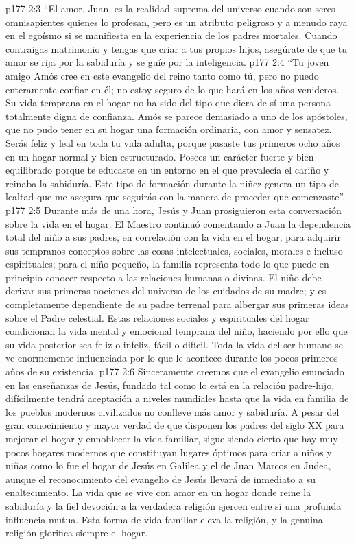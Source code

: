\vs p177 2:3 “El amor, Juan, es la realidad suprema del universo cuando son seres omnisapientes quienes lo profesan, pero es un atributo peligroso y a menudo raya en el egoísmo si se manifiesta en la experiencia de los padres mortales. Cuando contraigas matrimonio y tengas que criar a tus propios hijos, asegúrate de que tu amor se rija por la sabiduría y se guíe por la inteligencia.
\vs p177 2:4 “Tu joven amigo Amós cree en este evangelio del reino tanto como tú, pero no puedo enteramente confiar en él; no estoy seguro de lo que hará en los años venideros. Su vida temprana en el hogar no ha sido del tipo que diera de sí una persona totalmente digna de confianza. Amós se parece demasiado a uno de los apóstoles, que no pudo tener en su hogar una formación ordinaria, con amor y sensatez. Serás feliz y leal en toda tu vida adulta, porque pasaste tus primeros ocho años en un hogar normal y bien estructurado. Posees un carácter fuerte y bien equilibrado porque te educaste en un entorno en el que prevalecía el cariño y reinaba la sabiduría. Este tipo de formación durante la niñez genera un tipo de lealtad que me asegura que seguirás con la manera de proceder que comenzaste”.
\vs p177 2:5 Durante más de una hora, Jesús y Juan prosiguieron esta conversación sobre la vida en el hogar. El Maestro continuó comentando a Juan la dependencia total del niño a sus padres, en correlación con la vida en el hogar, para adquirir sus tempranos conceptos sobre las cosas intelectuales, sociales, morales e incluso espirituales; para el niño pequeño, la familia representa todo lo que puede en principio conocer respecto a las relaciones humanas o divinas. El niño debe derivar sus primeras nociones del universo de los cuidados de su madre; y es completamente dependiente de su padre terrenal para albergar sus primeras ideas sobre el Padre celestial. Estas relaciones sociales y espirituales del hogar condicionan la vida mental y emocional temprana del niño, haciendo por ello que su vida posterior sea feliz o infeliz, fácil o difícil. Toda la vida del ser humano se ve enormemente influenciada por lo que le acontece durante los pocos primeros años de su existencia.
\vs p177 2:6 \pc Sinceramente creemos que el evangelio enunciado en las enseñanzas de Jesús, fundado tal como lo está en la relación padre\hyp{}hijo, difícilmente tendrá aceptación a niveles mundiales hasta que la vida en familia de los pueblos modernos civilizados no conlleve más amor y sabiduría. A pesar del gran conocimiento y mayor verdad de que disponen los padres del siglo XX para mejorar el hogar y ennoblecer la vida familiar, sigue siendo cierto que hay muy pocos hogares modernos que constituyan lugares óptimos para criar a niños y niñas como lo fue el hogar de Jesús en Galilea y el de Juan Marcos en Judea, aunque el reconocimiento del evangelio de Jesús llevará de inmediato a su enaltecimiento. La vida que se vive con amor en un hogar donde reine la sabiduría y la fiel devoción a la verdadera religión ejercen entre sí una profunda influencia mutua. Esta forma de vida familiar eleva la religión, y la genuina religión glorifica siempre el hogar.
